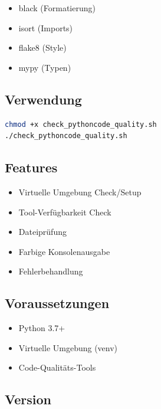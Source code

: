 \documentclass{content/vorlage-design-main}
\begin{document}
\begin{itemize}

\item
  black (Formatierung)
\item
  isort (Imports)
\item
  flake8 (Style)
\item
  mypy (Typen)
\end{itemize}

\subsection{Verwendung}\label{verwendung-2}

\begin{lstlisting}[language=bash]
chmod +x check_pythoncode_quality.sh
./check_pythoncode_quality.sh
\end{lstlisting}

\subsection{Features}\label{features-1}

\begin{itemize}

\item
  Virtuelle Umgebung Check/Setup
\item
  Tool-Verfügbarkeit Check
\item
  Dateiprüfung
\item
  Farbige Konsolenausgabe
\item
  Fehlerbehandlung
\end{itemize}

\subsection{Voraussetzungen}\label{voraussetzungen-2}

\begin{itemize}

\item
  Python 3.7+
\item
  Virtuelle Umgebung (venv)
\item
  Code-Qualitäts-Tools
\end{itemize}

\subsection{Version}\label{version-1}
\end{document}
